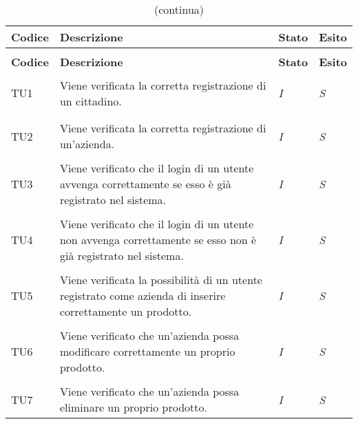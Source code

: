 		\begin{longtable}{ >{\centering}p{} >{}p{}
				>{\centering}p{} >{\centering}p{}}
			
			\caption{Riepilogo test di unità}\\	
			\rowcolorhead
			\textbf{\color{white}Codice} 
			& \centering\textbf{\color{white}Descrizione} 
			& \centering\textbf{\color{white}Stato}
			& \centering\textbf{\color{white}Esito} 
			\tabularnewline %
			\endfirsthead	
			
			\rowcolor{white}\caption[]{(continua)}\\	
			\rowcolorhead
			\textbf{\color{white}Codice} 
			& \centering\textbf{\centering\color{white}Descrizione} 
			& \centering\textbf{\color{white}Stato}
			& \centering\textbf{\color{white}Esito} 
			\tabularnewline %
			\endhead	
			
			
			\hypertarget{TU1}{TU1} & Viene verificata la corretta 
			registrazione di un cittadino. & \textit{I} & \textit{S}\\ 
			
			\tabularnewline
			\hypertarget{TU2}{TU2} & Viene verificata la corretta 
			registrazione di un'azienda. & \textit{I} & \textit{S}\\
			
			\tabularnewline
			\hypertarget{TU3}{TU3} & Viene verificato che il login di un utente 
			avvenga correttamente se esso è già registrato nel sistema. & 
			\textit{I} & \textit{S}\\ 
			
			\tabularnewline
			\hypertarget{TU4}{TU4} & Viene verificato che il login di un utente 
			non avvenga correttamente se esso non è già registrato nel sistema. 
			& \textit{I} & \textit{S}\\ 
			
			\tabularnewline
			\hypertarget{TU5}{TU5} & Viene verificata la possibilità di un 
			utente registrato come azienda di inserire correttamente un 
			prodotto. & \textit{I} & \textit{S}\\
			
			\tabularnewline
			\hypertarget{TU6}{TU6} & Viene verificato che un'azienda possa 
			modificare correttamente un proprio prodotto. & \textit{I} & 
			\textit{S}\\
			
			\tabularnewline
			\hypertarget{TU7}{TU7} & Viene verificato che un'azienda possa 
			eliminare un proprio prodotto. & \textit{I} & \textit{S}\\ 
			

\end{longtable}
